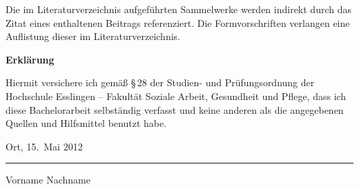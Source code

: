 \documentclass[a4paper,fontsize=11pt,parskip=off,open=any,bibtotoc,headings=normal,appendixrefix=true,listof=totoc]{scrbook}
\begin{document}
\noindent
Die im Literaturverzeichnis aufgeführten Sammelwerke werden indirekt durch das Zitat eines
enthaltenen Beitrags referenziert. Die Formvorschriften verlangen eine Auflistung dieser im
Literaturverzeichnis.







\clearpage
\pagestyle{empty}

\centering
\begin{minipage}{.66\textwidth}
\begin{center}
{\Huge\textbf{Erklärung}}
\end{center}
\vspace{1.5\baselineskip}


Hiermit versichere ich gemäß §\,28 der Studien- und
Prüfungsordnung der Hochschule Esslingen -- Fakultät Soziale Arbeit, Gesundheit
und Pflege, dass ich diese Bachelorarbeit selbständig verfasst und keine anderen als die angegebenen Quellen und Hilfsmittel benutzt habe. 

\vspace{3ex}
Ort, 15.\ Mai 2012

\vspace{3cm}
\hrule
\vspace{.2cm}
Vorname Nachname

\end{minipage}
\end{document}
